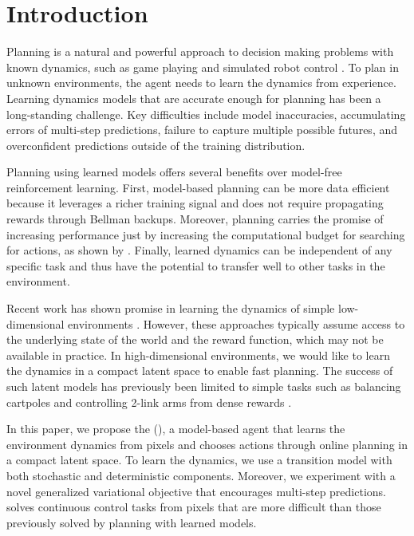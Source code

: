 \section{Introduction}
\label{introduction}

\afterpage{}

Planning is a natural and powerful approach to decision making problems with known dynamics, such as game playing and simulated robot control \citep{tassa2012mpc,silver2017alphago,moravvcik2017deepstack}. To plan in unknown environments, the agent needs to learn the dynamics from experience. Learning dynamics models that are accurate enough for planning has been a long-standing challenge. 
Key difficulties include model inaccuracies, accumulating errors of multi-step predictions, failure to capture multiple possible futures, and overconfident predictions outside of the training distribution.

Planning using learned models offers several benefits over model-free reinforcement learning. First, model-based planning can be more data efficient because it leverages a richer training signal and does not require propagating rewards through Bellman backups. Moreover, planning carries the promise of increasing performance just by increasing the computational budget for searching for actions, as shown by \citet{silver2017alphago}. Finally, learned dynamics can be independent of any specific task and thus have the potential to transfer well to other tasks in the environment.

Recent work has shown promise in learning the dynamics of simple low-dimensional environments \citep{deisenroth2011pilco,gal2016deeppilco,amos2018awareness,chua2018pets,henaff2018planbybackprop}. However, these approaches typically assume access to the underlying state of the world and the reward function, which may not be available in practice. In high-dimensional environments, we would like to learn the dynamics in a compact latent space to enable fast planning. The success of such latent models has previously been limited to simple tasks such as balancing cartpoles and controlling 2-link arms from dense rewards \citep{watter2015e2c,banijamali2017rce}.

In this paper, we propose the \fullmethod (\method), a model-based agent that learns the environment dynamics from pixels and chooses actions through online planning in a compact latent space. To learn the dynamics, we use a transition model with both stochastic and deterministic components. Moreover, we experiment with a novel generalized variational objective that encourages multi-step predictions. \method solves continuous control tasks from pixels that are more difficult than those previously solved by planning with learned models.


